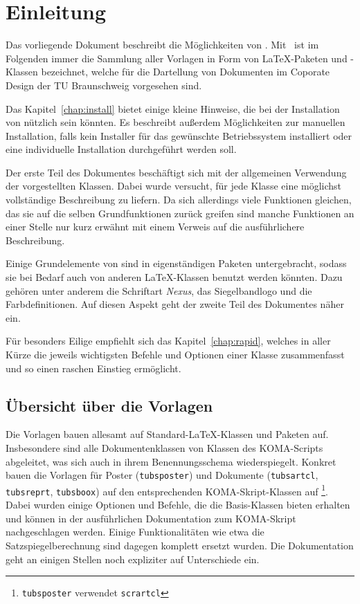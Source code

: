 \chapter{Einleitung}

Das vorliegende Dokument beschreibt die Möglichkeiten von \tubslatex.
Mit \tubslatex\ ist im Folgenden immer die Sammlung aller Vorlagen in Form
von \LaTeX-Paketen und -Klassen bezeichnet, welche für die Dartellung von
Dokumenten im Coporate Design der TU Braunschweig vorgesehen sind.

Das Kapitel~\ref{chap:install} bietet einige kleine Hinweise, die bei
der Installation von \tubslatex nützlich sein könnten.
Es beschreibt außerdem Möglichkeiten zur manuellen Installation, falls
kein Installer für das gewünschte Betriebssystem installiert oder eine
individuelle Installation durchgeführt werden soll.

Der erste Teil des Dokumentes beschäftigt sich mit der allgemeinen Verwendung
der vorgestellten Klassen.
Dabei wurde versucht, für jede Klasse eine möglichst vollständige Beschreibung
zu liefern. Da sich allerdings viele Funktionen gleichen, das sie auf die selben
Grundfunktionen zurück greifen sind manche Funktionen an einer Stelle nur kurz erwähnt mit einem Verweis auf die ausführlichere Beschreibung.

Einige Grundelemente von \tubslatex sind in eigenständigen Paketen untergebracht, sodass sie bei Bedarf auch von anderen \LaTeX-Klassen benutzt werden könnten. Dazu gehören unter anderem die Schriftart \emph{Nexus}, das Siegelbandlogo und die Farbdefinitionen.
Auf diesen Aspekt geht der zweite Teil des Dokumentes näher ein.%

Für besonders Eilige empfiehlt sich das Kapitel~\ref{chap:rapid}, welches in aller Kürze die jeweils wichtigsten Befehle und Optionen einer Klasse zusammenfasst und so einen raschen Einstieg ermöglicht.

\section{Übersicht über die Vorlagen}

Die Vorlagen bauen allesamt auf Standard-\LaTeX-Klassen und Paketen auf.
Insbesondere sind alle Dokumentenklassen von Klassen des KOMA-Scripts
abgeleitet, was sich auch in ihrem Benennungsschema wiederspiegelt.
Konkret bauen die Vorlagen für Poster (\texttt{tubsposter}) und Dokumente
(\texttt{tubsartcl}, \texttt{tubsreprt}, \texttt{tubsboox}) auf
den entsprechenden KOMA-Skript-Klassen auf%
\footnote{\texttt{tubsposter} verwendet \texttt{scrartcl}}.
Dabei wurden einige Optionen und Befehle, die die Basis-Klassen bieten erhalten
und können in der ausführlichen Dokumentation zum KOMA-Skript\cite{koma-skript}
nachgeschlagen werden.
Einige Funktionalitäten wie etwa die Satzspiegelberechnung sind dagegen
komplett ersetzt wurden.
Die Dokumentation geht an einigen Stellen noch expliziter auf Unterschiede ein.

